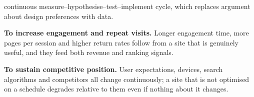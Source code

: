 \begin{qlist}
\begin{apts}
      continuous measure--hypothesise--test--implement cycle, which replaces
      argument about design preferences with data.
\item \textbf{To increase engagement and repeat visits.} Longer engagement
      time, more pages per session and higher return rates follow from a site
      that is genuinely useful, and they feed both revenue and ranking signals.
\item \textbf{To sustain competitive position.} User expectations, devices,
      search algorithms and competitors all change continuously; a site that is
      not optimised on a schedule degrades relative to them even if nothing
      about it changes.
\end{apts}


\end{qlist}
